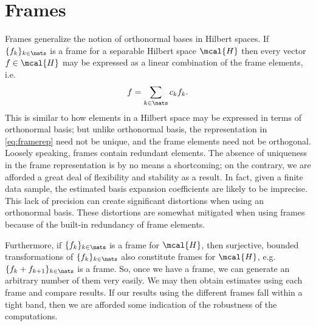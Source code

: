 \documentclass[a4paper, 12pt]{article}
\newcommand{\sumn}{\ensuremath{\sum_{k \in \nats}}\xspace}
\newcommand{\hs}{\ensuremath{\mcal{H}}\xspace}
\begin{document}
\section{ Frames}\label{sec:gabor} 
Frames generalize the notion of orthonormal bases in  Hilbert spaces. If $\{f_k\}_{k \in \nats}$ is a frame for a separable Hilbert space \hs then every vector $f \in \hs$ may be expressed as a linear combination of the frame elements, i.e.
\begin{align}
  f = \sumn c_k f_k.
  \label{eq:framerep}
\end{align}
This is similar to how elements in a Hilbert space may be expressed in terms of orthonormal basis; but unlike orthonormal basis, the representation in \eqref{eq:framerep} need not be unique, and the frame elements need not be orthogonal. Loosely speaking, frames contain redundant elements. The absence of uniqueness in the frame representation is by no means a shortcoming; on the contrary, we are afforded a great deal of flexibility and stability as a result. In fact, given a finite data sample, the estimated basis expansion coefficients are likely to be imprecise. This lack of precision can create significant distortions when using an orthonormal basis. These distortions are somewhat mitigated when using frames because of the built-in redundancy of frame elements. 



Furthermore, if $\{f_k\}_{k \in \nats}$ is a frame for \hs, then surjective, bounded  transformations of $\{f_k\}_{k \in \nats}$  also constitute frames for \hs, e.g. $\{f_k + f_{k+1}\}_{k \in \nats}$ is a frame. So, once we have a frame, we can generate an arbitrary number of them very easily. We may then obtain estimates using each frame and compare results. If our results using the different frames fall within a tight band, then we are afforded some indication of the robustness of the computations.   


\end{document}
